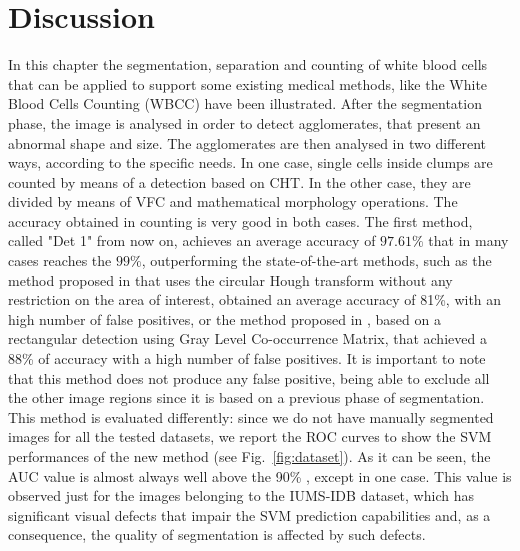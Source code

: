 \documentclass[final,a4paper,12pt,english]{UnicaPhdThesis3}
\begin{document}
\section{Discussion}
In this chapter the segmentation, separation and counting of white blood cells that can be applied to support some existing medical methods, like the White Blood Cells Counting (\acs{WBCC}) have been illustrated. After the segmentation phase, the image is analysed in order to detect agglomerates, that present an abnormal shape and size. The agglomerates are then analysed in two different ways, according to the specific needs. In one case, single cells inside clumps are counted by means of a detection based on CHT. In the other case, they are divided by means of VFC and mathematical morphology operations. The accuracy obtained in counting is very good in both cases. 
The first method, called "Det 1" from now on, achieves an average accuracy of $97.61\%$ that in many cases reaches the $99\%$, outperforming the state-of-the-art methods, such as the method proposed in \cite{Mahmood} that uses the circular Hough transform without any restriction on the area of interest, obtained an average accuracy of 81\%, with an high number of false positives, or the method proposed in \cite{Alilou}, based on a rectangular detection using Gray Level Co-occurrence Matrix, that achieved a 88\% of accuracy with a high number of false positives. It is important to note that this method does not produce any false positive, being able to exclude all the other image regions since it is based on a previous phase of segmentation. 
This method is evaluated differently: since we do not have manually segmented images for all the tested datasets, we report the ROC curves to show the SVM performances of the new method (see Fig.~\ref{fig:dataset}). As it can be seen, the AUC value is almost always well above the 90\% , except in one case. This value is observed just for the images belonging to the IUMS-IDB dataset, which has significant visual defects that impair the SVM prediction capabilities and, as a consequence, the quality of segmentation is affected by such defects.
\end{document}
